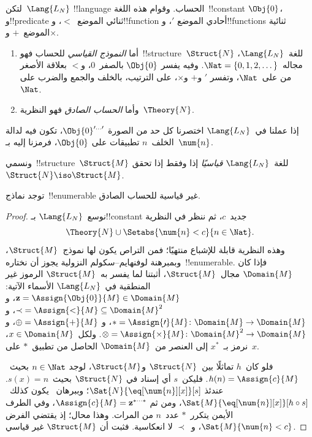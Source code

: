 \documentclass[../../../include/open-logic-section]{subfiles}
\begin{document}

\begin{defn}
لتكن~$\Lang{L_N}$ !!{language} الحساب. وقوام هذه اللغة~!!{constant}
$\Obj{0}$، و!!{predicate} ثنائي الموضع~$<$، و!!{function} أحادي الموضع
$\prime$، و!!{function}s ثنائية الموضع~$+$ و$\times$.
\begin{enumerate}
\item أما \emph{النموذج القياسي} للحساب فهو~!!{structure}~$\Struct{N}$
  للغة~$\Lang{L_N}$، مجاله~$\Nat = \{ 0, 1, 2, \dots\}$. وفيه يفسر
  $\Obj{0}$ بالصفر~$0$، و$<$ بعلاقة الأصغر من على~$\Nat$، وتفسر
  $\prime$ و$+$ و$\times$، على الترتيب، بالخلف والجمع والضرب على~$\Nat$.
\item وأما \emph{الحساب الصادق} فهو النظرية~$\Theory{N}$.
\end{enumerate}
\end{defn}

إذا عملنا في~$\Lang{L_N}$ اختصرنا كل حد من الصورة
$\Obj{0}^{\prime\dots\prime}$، تكون فيه لدالة الخلف~$n$ تطبيقات على
$\Obj{0}$، فرمزنا إليه بـ~$\num{n}$.

\begin{defn}
ونسمي~!!{structure}~$\Struct{M}$ للغة~$\Lang{L_N}$ \emph{قياسيًا} إذا
وفقط إذا تحقق~$\Struct{N} \iso \Struct{M}$.
\end{defn}

\begin{thm}
توجد نماذج~!!{enumerable} غير قياسية للحساب الصادق.
\end{thm}

\begin{proof}
نوسع~$\Lang{L_N}$ بـ!!{constant} جديد~$c$، ثم ننظر في النظرية
\[
\Theory{N} \cup \Setabs{\num{n} < c}{n \in \Nat}.
\]
وهذه النظرية قابلة للإشباع منتهيًا؛ فمن التراص يكون لها نموذج~$\Struct{M}$،
وبمبرهنة لوفنهايم--سكولم النزولية يجوز أن نختاره~!!{enumerable}. فإذا كان
$\Domain{M}$ مجال~$\Struct{M}$، أثبتنا لما يفسر به~$\Struct{M}$ الرموز
غير المنطقية في~$\Lang{L_N}$ الأسماء الآتية:
$\mathbf{z} = \Assign{\Obj{0}}{M} \in \Domain{M}$، و
${\prec} = \Assign{<}{M} \subseteq \Domain{M}^2$، و
$* = \Assign{\prime}{M} \colon \Domain{M} \to \Domain{M}$، و
$\oplus = \Assign{+}{M}$، و
$\otimes = \Assign{\times}{M} \colon \Domain{M}^2 \to \Domain{M}$.
ولكل~$x \in \Domain{M}$، نرمز بـ~$x^*$ إلى العنصر من~$\Domain{M}$
الحاصل من تطبيق~$*$ على~$x$.

فلو كان~$h$ تماثلًا بين~$\Struct{N}$ و$\Struct{M}$، لوجد
$n \in \Nat$ بحيث~$h(n) = \Assign{c}{M}$. فليكن~$s$ أي إسناد في
$\Struct{N}$ بحيث~$s(x) = n$. عندئذ
$\Sat{N}{\eq[\num{n}][x]}[s]$؛ وببرهان~ يكون
كذلك~$\Sat{M}{\eq[\num{n}][x]}[h \circ s]$، ومن ثم
$\Assign{c}{M} = \mathbf{z}^{*\cdots *}$، وفي الطرف الأيمن يتكرر~$*$ عدد~$n$
من المرات. وهذا محال؛ إذ يقتضي الفرض
$\Sat{M}{\num{n} < c}$، و~$\prec$ لا انعكاسية. فثبت أن
$\Struct{M}$ غير قياسي.
\end{proof}
\end{document}
